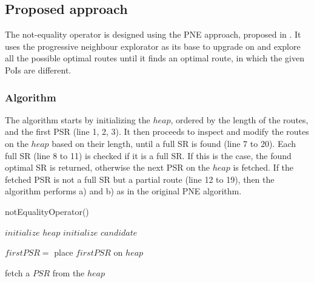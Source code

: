 
\subsection{Proposed approach} 
\label{sec:approachNEO}
The not-equality operator is designed using the PNE approach, proposed in \cite{OSR}. It uses the progressive neighbour explorator as its base to upgrade on and explore all the possible optimal routes until it finds an optimal route, in which the given PoIs are different.

\subsubsection{Algorithm}
\label{sec:algortihmNEO}
The algorithm \texttt{} starts by initializing the $heap$, ordered by the length of the routes, and the first PSR (line 1, 2, 3). It then proceeds to inspect and modify the routes on the $heap$ based on their length, until a full SR is found (line 7 to 20). Each full SR (line 8 to 11) is checked if it is a full SR. If this is the case, the found optimal SR is returned, otherwise the next PSR on the $heap$ is fetched. If the fetched PSR is not a full SR but a partial route (line 12 to 19), then the algorithm performs a) and b) as in the original PNE algorithm. \newline

\begin{algorithm}[H]
\caption{notEqualityOperator()}
\label{alg:notequality}
	
	
	\BlankLine
	
	$initialize$ $heap$\;
	$initialize$ $candidate$\;
	
	$firstPSR =$\;
	place $firstPSR$ on $heap$\;
	
	\BlankLine
	
	
	fetch a $PSR$ from the $heap$\;
	
\end{algorithm}


